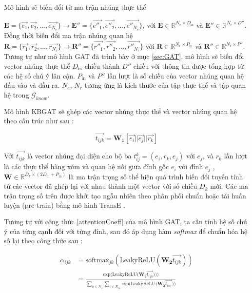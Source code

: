 Mô hình sẽ biến đổi từ ma trận nhúng thực thể

$\mathbf{E} = \Big\{\overrightarrow{e_1}, \overrightarrow{e_2}, ...,  \overrightarrow{e_{N_e}}\Big\} \xrightarrow{} \mathbf{E''} = \Big\{\overrightarrow{e''_1}, \overrightarrow{e''_2}, ...,  \overrightarrow{e''_{N_e}}\Big\}$, với $\mathbf{E} \in \mathbb{R}^{N_e \times D_{\text{in}}}$ và $\mathbf{E''} \in \mathbb{R}^{N_e \times D''}$.
Đồng thời biến đổi ma trận nhúng quan hệ 
$\mathbf{R} = \Big\{\overrightarrow{r_1}, \overrightarrow{r_2}, ...,  \overrightarrow{r_{N_r}}\Big\} \xrightarrow{} \mathbf{R''} = \Big\{\overrightarrow{r''_1}, \overrightarrow{r''_2}, ...,  \overrightarrow{r''_{N_r}}\Big\}$ với $\mathbf{R} \in \mathbb{R}^{N_r \times P_{\text{in}}}$ và $\mathbf{R''} \in \mathbb{R}^{N_r \times P''}$. Tương tự như mô hình GAT đã trình bày ở mục \ref{sec:GAT}, mô hình sẽ biến đổi vector nhúng thực thể $D_{\text{in}}$ chiều thành $D''$ chiều với thông tin được tổng hợp từ các hệ số chú ý lân cận. $P_{\text{in}}$ và $P''$ lần lượt là số chiều của vector nhúng quan hệ đầu vào và đầu ra. $N_e$, $N_r$ tương ứng là kích thước của tập thực thể và tập quan hệ trong $\mathcal{G}_{know}$.

Mô hình KBGAT sẽ ghép các vector nhúng thực thể và vector nhúng quan hệ theo cấu trúc như sau :

\begin{equation}
\label{attentionWithRelation}
\overrightarrow{t_{ijk}} = \mathbf{W_1} [\overrightarrow{e_i} || \overrightarrow{e_j} || \overrightarrow{r_k}]
\end{equation}

Với $\overrightarrow{t_{ijk}}$ là vector nhúng đại diện cho bộ ba  $t_{ij}^k = (e_i, r_k, e_j)$ với $e_j$, và $r_k$ lần lượt là các thực thể hàng xóm và quan hệ nối giữa đỉnh gốc $e_i$ với đỉnh $e_j$ , $\mathbf{W} \in \mathbb{R}^{D_k \times (2 D_{\text{in}} + P_{\text{in}})}$ là ma trận trọng số thể hiện quá trình biến đổi tuyến tính từ các vector đã ghép lại với nhau thành một vector với số chiều $D_k$ mới. Các ma trận trọng số trên được khởi tạo ngẫu nhiên theo phân phối chuẩn hoặc tái huấn luyện (pre-train) bằng mô hình TransE \cite{bordes2013translating}.

Tương tự với công thức \ref{attentionCoeff} của mô hình GAT, ta cần tính hệ số chú ý của từng cạnh đối với từng đỉnh, sau đó áp dụng hàm \textit{softmax} để chuẩn hóa hệ số lại theo công thức sau :

\begin{equation}
\label{attentionRelationCoeff}
\begin{split}
\alpha_{ijk}& = \text{softmax}_{jk}(\text{LeakyReLU}(\mathbf{W_2} \overrightarrow{t_{ijk}}))\\
&= \frac{
	\text{exp} \Big( \text{LeakyReLU} \Big( \mathbf{W_2} \overrightarrow{t_{ijk}}\Big) \Big))
}
{
	\sum_{n\in \mathcal{N}_i} \sum_{r\in \mathcal{R}_{in}}
	\text{exp} \Big( \text{LeakyReLU} \Big( \mathbf{W_2} \overrightarrow{t_{inr}} \Big) \Big)
}
\end{split}
\end{equation}

